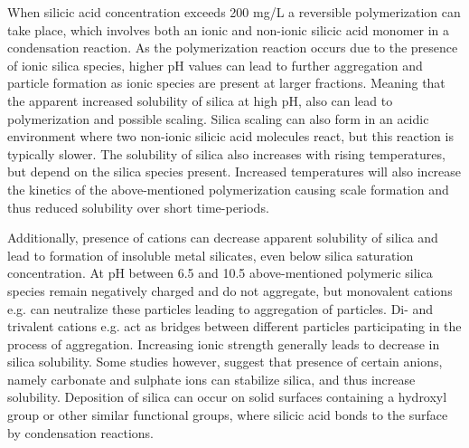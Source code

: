 When silicic acid concentration exceeds 200 mg/L a reversible polymerization can take place, which involves both an ionic and non-ionic silicic acid monomer in a condensation reaction. 
As the polymerization reaction occurs due to the presence of ionic silica species, higher pH values can lead to further aggregation and particle formation as ionic species are present at larger fractions.
Meaning that the apparent increased solubility of silica at high pH, also can lead to polymerization and possible scaling.   \citep{ChemistrySilicaScale2014}
Silica scaling can also form in an acidic environment where two non-ionic silicic acid molecules react, but this reaction is typically slower. \citep{ChemistrySilicaScale2014}
The solubility of silica also increases with rising temperatures, but depend on the silica species present. 
Increased temperatures will also increase the kinetics of the above-mentioned polymerization causing scale formation and thus reduced solubility over short time-periods. \citep{ChemistrySilicaScale2014}


Additionally, presence of cations can decrease apparent solubility of silica and lead to formation of insoluble metal silicates, even below silica saturation concentration. 
At pH between 6.5 and 10.5 above-mentioned polymeric silica species remain negatively charged and do not aggregate, but monovalent cations e.g.  can neutralize these particles leading to aggregation of particles. 
Di- and trivalent cations e.g.  act as bridges between different particles participating in the process of aggregation. \citep{ChemistrySilicaScale2014}
Increasing ionic strength generally leads to decrease in silica solubility.
Some studies however, suggest that presence of certain anions, namely carbonate and sulphate ions can stabilize silica, and thus increase solubility. \cite{ChemistrySilicaScale2014} %
Deposition of silica can occur on solid surfaces containing a hydroxyl group or other similar functional groups, where silicic acid bonds to the surface by condensation reactions. \citep{ChemistrySilicaScale2014} 

